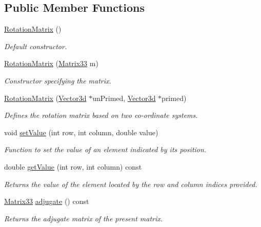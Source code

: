\subsection*{\-Public \-Member \-Functions}
\begin{DoxyCompactItemize}
\item 
\hyperlink{classRotationMatrix_a4678658c45a6b89f2d06c48b318e2769}{\-Rotation\-Matrix} ()
\begin{DoxyCompactList}\small\item\em \-Default constructor. \end{DoxyCompactList}\item 
\hyperlink{classRotationMatrix_a234bf349cf56fc8561a41f5a3669675b}{\-Rotation\-Matrix} (\hyperlink{classMatrix33}{\-Matrix33} m)
\begin{DoxyCompactList}\small\item\em \-Constructor specifying the matrix. \end{DoxyCompactList}\item 
\hyperlink{classRotationMatrix_aa5506a5341c05e42d258a93137635a9b}{\-Rotation\-Matrix} (\hyperlink{classVector3d}{\-Vector3d} $\ast$un\-Primed, \hyperlink{classVector3d}{\-Vector3d} $\ast$primed)
\begin{DoxyCompactList}\small\item\em \-Defines the rotation matrix based on two co-\/ordinate systems. \end{DoxyCompactList}\item 
void \hyperlink{classMatrix33_a6cdcec77fd089b2e73ad7ae85ecff30b}{set\-Value} (int row, int column, double value)
\begin{DoxyCompactList}\small\item\em \-Function to set the value of an element indicated by its position. \end{DoxyCompactList}\item 
double \hyperlink{classMatrix33_ab53b3e37ad830a87a804cf26311ba088}{get\-Value} (int row, int column) const 
\begin{DoxyCompactList}\small\item\em \-Returns the value of the element located by the row and column indices provided. \end{DoxyCompactList}\item 
\hyperlink{classMatrix33}{\-Matrix33} \hyperlink{classMatrix33_a07b999a7b1c905f3c98ba3792e6fa33f}{adjugate} () const 
\begin{DoxyCompactList}\small\item\em \-Returns the adjugate matrix of the present matrix. \end{DoxyCompactList}\item 

\end{DoxyCompactItemize}
